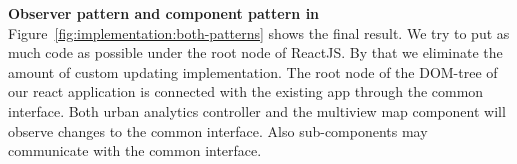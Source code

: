 
\textbf{Observer pattern and component pattern in \cmvs{}}
Figure~\ref{fig:implementation:both-patterns} shows the final result.
We try to put as much code as possible under the root node of ReactJS\@.
By that we eliminate the amount of custom updating implementation.
The root node of the DOM-tree of our react application is connected with the existing app through the common interface.
Both urban analytics controller and the multiview map component will observe changes to the common interface.
Also sub-components may communicate with the common interface.
